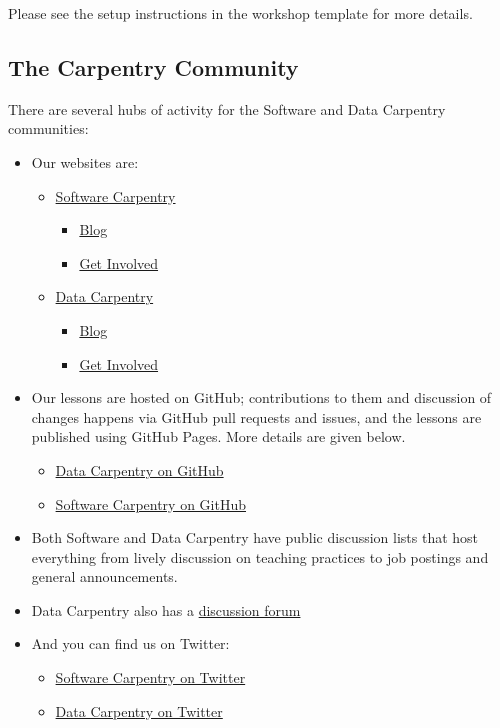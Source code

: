 Please see the setup instructions in the workshop template for more
details.

\subsection{The Carpentry Community}\label{the-carpentry-community}

There are several hubs of activity for the Software and Data Carpentry
communities:

\begin{itemize}
\item
  Our websites are:

  \begin{itemize}
    \item
    \href{http://software-carpentry.org}{Software Carpentry}

    \begin{itemize}
        \item
      \href{http://software-carpentry.org/blog/}{Blog}
    \item
      \href{http://software-carpentry.org/join/}{Get Involved}
    \end{itemize}
  \item
    \href{http://datacarpentry.org}{Data Carpentry}

    \begin{itemize}
        \item
      \href{http://datacarpentry.org/blog/}{Blog}
    \item
      \href{http://datacarpentry.org/involved/}{Get Involved}
    \end{itemize}
  \end{itemize}
\item
  Our lessons are hosted on GitHub; contributions to them and discussion
  of changes happens via GitHub pull requests and issues, and the
  lessons are published using GitHub Pages. More details are given
  below.

  \begin{itemize}
    \item
    \href{https://github.com/datacarpentry}{Data Carpentry on GitHub}
  \item
    \href{https://github.com/swcarpentry}{Software Carpentry on GitHub}
  \end{itemize}
\item
  Both Software and Data Carpentry have public discussion lists that
  host everything from lively discussion on teaching practices to job
  postings and general announcements.
\item
  Data Carpentry also has a
  \href{http://discuss.datacarpentry.org/}{discussion forum}
\item
  And you can find us on Twitter:

  \begin{itemize}
    \item
    \href{https://twitter.com/swcarpentry}{Software Carpentry on
    Twitter}
  \item
    \href{https://twitter.com/datacarpentry}{Data Carpentry on Twitter}
  \end{itemize}
\end{itemize}

